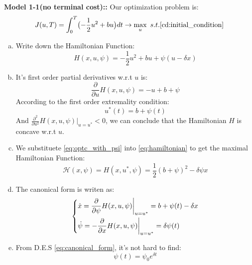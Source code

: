 \documentclass{article}
\begin{document}
{\bf Model 1-1(no terminal cost)::} Our optimization problem is:
\begin{equation}
    J(u,T)=\int_{0}^{T}\bigl(-\frac{1}{2}u^2+bu\bigr)dt\rightarrow \max_{u}\ s.t. \eqref{cd:initial_condition}
\end{equation}
\begin{enumerate}[a)]
    \item Write down the Hamiltonian Function:
            \begin{equation}\label{eq:hamiltonian}
                H(x,u,\psi)=-\frac{1}{2}u^2+bu+\psi (u-\delta x)
            \end{equation}
    \item It's first order partial derivatives w.r.t $u$ is:
            \begin{equation}
                \frac{\partial }{\partial u}H(x,u,\psi)=-u+b+\psi
            \end{equation}
             According to the first order extremality condition:
             \begin{equation}\label{eq:optc_with_psi}
                u^*(t)=b+\psi(t)
             \end{equation}
             And $\frac{\partial^2 }{\partial u^2}H(x,u,\psi)\big|_{u=u^*}<0$, we can conclude that the Hamiltonian $H$ is concave w.r.t $u$.
    \item We substituete \eqref{eq:optc_with_psi} into \eqref{eq:hamiltonian} to get the maximal Hamiltonian Function:
             \begin{equation}
                \mathcal{H}(x, \psi)=H(x,u^*,\psi)=\frac{1}{2}(b+\psi)^2-\delta\psi x
             \end{equation}
    \item The canonical form is writen as:
             \begin{equation}\label{eq:canonical_form}
                 \begin{dcases}
                    \dot{x}= \frac{\partial }{\partial \psi}H(x,u,\psi)\bigg|_{u=u^*}=b+\psi(t)-\delta x\\
                    \dot{\psi}=-\frac{\partial }{\partial x}H(x,u,\psi)\bigg|_{u=u^*}=\delta\psi(t)
                \end{dcases}
             \end{equation}
    \item From D.E.S \eqref{eq:canonical_form}, it's not hard to find:
             \begin{equation}\label{eq:psi_with_psi0}
                 \psi(t)=\psi_0 e^{\delta t}

\end{equation}
\end{enumerate}
\end{document}
